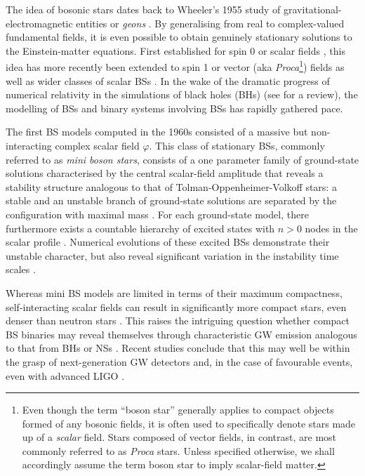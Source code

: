 \documentclass[]{iopart}
\newcommand{\us}[1]{\textcolor{teal}{[{\it\textbf{US: #1}}]} }
\begin{document}
The idea of bosonic stars dates back to Wheeler's 1955 study of
gravitational-electromagnetic entities or {\it geons}
\cite{Wheeler:1955zz}.  By generalising from real to complex-valued
fundamental fields, it is even possible to obtain genuinely stationary
solutions to the Einstein-matter equations. First established for
spin 0 or scalar fields \cite{Feinblum:1968nwc,Kaup:1968zz,Ruffini:1969qy},
this idea has more recently been extended to spin 1 or vector (aka
{\it Proca}\footnote{Even though the term ``boson star''
generally applies to compact objects formed of any bosonic
fields, it is often used to specifically denote stars made
up of a {\it scalar} field. Stars
composed of vector fields, in contrast, are most commonly
referred to as {\it Proca} stars. Unless specified otherwise,
we shall accordingly assume the term boson star to imply
scalar-field matter.})
fields \cite{Brito:2015pxa} as well as wider classes of scalar BSs
\cite{Alcubierre:2018ahf,Choptuik:2019zji}.  In the wake of the
dramatic progress of numerical relativity in the simulations of
black holes (BHs) \cite{Pretorius:2005gq,Campanelli:2005dd,Baker:2005vv}
(see \cite{Sperhake:2014wpa} for a review), the modelling of BSs
and binary systems involving BSs has rapidly gathered pace.

The first BS models computed in the 1960s consisted of a massive
but non-interacting complex scalar field $\varphi$.  This class of
stationary BSs, commonly referred to as {\it mini boson stars},
consists of a one parameter family of ground-state solutions
characterised by the central scalar-field amplitude that reveals a
stability structure analogous to that of Tolman-Oppenheimer-Volkoff
\cite{Tolman:1939jz,Oppenheimer:1939ne} stars: a stable and an
unstable branch of ground-state solutions are separated by the
configuration with maximal mass
\cite{Breit:1983nr,Gleiser:1988ih,Seidel:1990jh}. For each ground-state
model, there furthermore exists a countable hierarchy of excited
states with $n>0$ nodes in the scalar profile
\cite{Lee:1991ax,Jetzer:1991jr,Liddle:1992fmk}. Numerical evolutions
of these excited BSs demonstrate their unstable character, but also
reveal significant variation in the instability time scales
\cite{Balakrishna:1997ej}.

Whereas mini BS models are limited in terms of their maximum
compactness, self-interacting scalar fields can result in significantly
more compact stars, even denser than neutron stars
\cite{Colpi:1986ye,Lee:1986ts,Schunck:1999zu,Hartmann:2012da}. This
raises the intriguing question whether compact BS binaries may
reveal themselves through characteristic GW emission analogous to
that from BHs or NSs \cite{Bustillo:2020syj}. Recent studies conclude
that this may well be within the grasp of next-generation GW detectors
and, in the case of favourable events, even with advanced LIGO
\cite{Sennett:2017etc,DiGiovanni:2020ror,Toubiana:2020lzd}.
\end{document}
